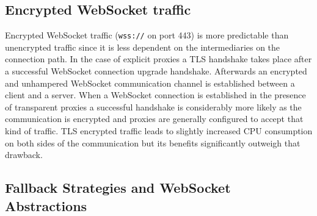 \newpage
\subsection{Encrypted WebSocket traffic}

Encrypted WebSocket traffic (\texttt{wss://} on port 443) is more predictable than unencrypted traffic since it is less dependent on the intermediaries on the connection path. In the case of explicit proxies a TLS handshake takes place after a successful WebSocket connection upgrade handshake. Afterwards an encrypted and unhampered WebSocket communication channel is established between a client and a server. When a WebSocket connection is established in the presence of transparent proxies a successful handshake is considerably more likely as the communication is encrypted and proxies are generally configured to accept that kind of traffic. TLS encrypted traffic leads to slightly increased CPU consumption on both sides of the communication but its benefits significantly outweigh that drawback.

\subsection{Fallback Strategies and WebSocket Abstractions}

